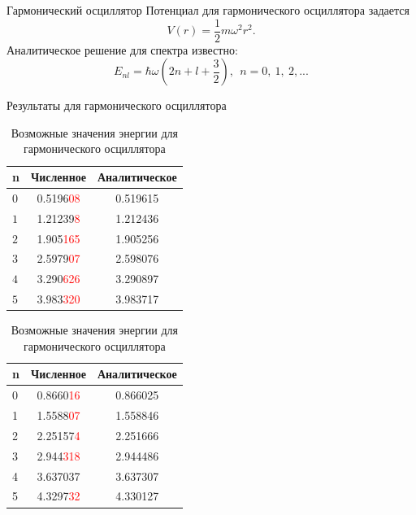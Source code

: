 \documentclass{beamer}
\begin{document}
\begin{frame}{Гармонический осциллятор}
 Потенциал для гармонического осциллятора задается
$$V(r) = \frac{1}{2} m \omega^2 r^2.$$
Аналитическое решение для спектра известно:
$$E_{nl} = \hbar \omega (2 n+l+\frac{3}{2}),~~ n = 0,~1,~2,...$$
\end{frame}

\begin{frame}{Результаты для гармонического осциллятора}
\begin{table}
\parbox{.45\linewidth}{
\centering
\begin{tabular}{l | c | c   }
n & Численное & Аналитическое \\
\hline \hline
$ 0 $&   0.5196\textcolor{red}{08} &    0.519615 \\
$ 1 $ &   1.21239\textcolor{red}{8} &    1.212436 \\
$ 2$ &   1.905\textcolor{red}{165} &    1.905256 \\
$ 3 $ &   2.5979\textcolor{red}{07} &    2.598076 \\
$ 4$ &   3.290\textcolor{red}{626} &    3.290897 \\
$ 5 $ &   3.983\textcolor{red}{320} &    3.983717 \\
\end{tabular}
\caption{$l=0$}
}
\hfill
\parbox{.45\linewidth}{
\centering
\begin{tabular}{l | c | c   }
n & Численное & Аналитическое \\
\hline \hline
0 &   0.8660\textcolor{red}{16} &    0.866025 \\
1 &   1.5588\textcolor{red}{07} &    1.558846 \\
2 &   2.25157\textcolor{red}{4} &    2.251666 \\
3 &   2.944\textcolor{red}{318} &    2.944486 \\
4 &   3.637037 &    3.637307 \\
5 &   4.3297\textcolor{red}{32} &    4.330127 \\
\end{tabular}
\caption{$l = 1$}
}
\caption{Возможные значения энергии для гармонического осциллятора}
\end{table}
\end{frame}
\end{document}
